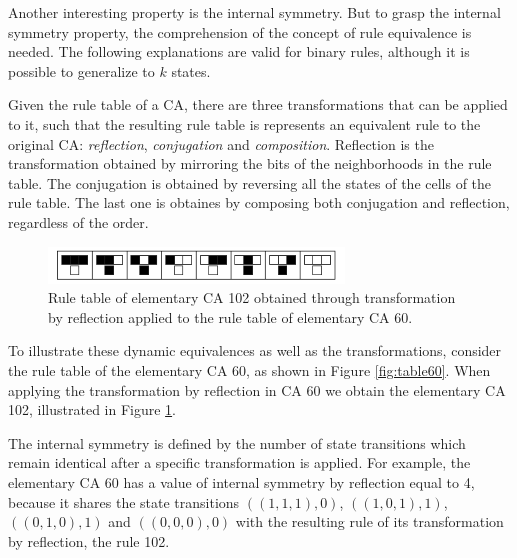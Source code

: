 \documentclass{llncs}
\begin{document}
Another interesting property is the internal symmetry. But to grasp the internal symmetry property, the comprehension of the concept of rule equivalence is needed. The following explanations are valid for binary rules, although it is possible to generalize to $k$ states.

Given the rule table of a CA, there are three transformations that can be applied to it, such that the resulting rule table is  represents an equivalent rule to the original CA: \textit{reflection}, \textit{conjugation} and \textit{composition}. Reflection is the transformation obtained by mirroring the bits of the neighborhoods in the rule table. The conjugation is obtained by reversing all the states of the cells of the rule table. The last one is obtaines by composing both conjugation and reflection, regardless of the order.

  \begin{figure}[!ht]
    \centering
    \includegraphics[width=0.7\textwidth]{fig_ruleIcon102.png}
    \caption{Rule table of elementary CA 102 obtained through transformation by reflection applied to the rule table of elementary CA 60.}
    \label{fig:table102}
  \end{figure}

To illustrate these dynamic equivalences as well as the transformations, consider the rule table of the elementary CA 60, as shown in Figure \ref{fig:table60}. When applying the transformation by reflection in CA 60 we obtain the elementary CA 102, illustrated in Figure \ref{fig:table102}.

The internal symmetry is defined by the number of state transitions which remain identical after a specific transformation is applied. For example, the elementary CA 60 has a value of internal symmetry by reflection equal to 4, because it shares the state transitions $((1,1,1),0)$, $((1,0,1),1)$, $((0,1,0),1)$ and $ ((0,0,0),0)$ with the resulting rule of its transformation by reflection, the rule 102.

\end{document}
